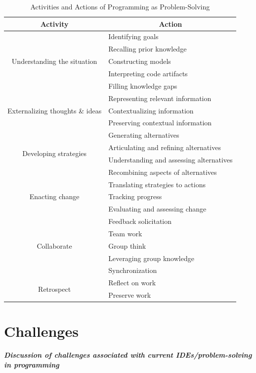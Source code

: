 \documentclass{ppig}
\newcommand{\bold}[1]{\textit{\textbf{\color{aoblue}#1}}} %
\begin{document}
\begin{table}[!htbp]
\caption{Activities and Actions of Programming as Problem-Solving}
\label{matrix}
\centering
\begin{tabular}{|c|l|}
	\hline
	\multicolumn{1}{|c|}{\textbf{Activity}} 
	& \multicolumn{1}{c|}{\textbf{Action}}\\\hline
	\multirow{5}{*}{Understanding the situation} 
	& Identifying goals \\\cline{2-2}
	& Recalling prior knowledge \\\cline{2-2}
	& Constructing models \\\cline{2-2}
	& Interpreting code artifacts \\\cline{2-2}
	& Filling knowledge gaps \\\hline
	\multirow{3}{*}{Externalizing thoughts \& ideas} 
	& Representing relevant information \\\cline{2-2}
	& Contextualizing information \\\cline{2-2}
	& Preserving contextual information \\\hline
	\multirow{4}{*}{Developing strategies} 
	& Generating alternatives \\\cline{2-2}
	& Articulating and refining alternatives \\\cline{2-2}
	& Understanding and assessing alternatives \\\cline{2-2}
	& Recombining aspects of alternatives \\\hline
	\multirow{3}{*}{Enacting change} 
	& Translating strategies to actions \\\cline{2-2}
	& Tracking progress \\\cline{2-2}
	& Evaluating and assessing change \\\hline
	\multirow{5}{*}{Collaborate} 
	& Feedback solicitation \\\cline{2-2}
	& Team work \\\cline{2-2}
	& Group think \\\cline{2-2}
	& Leveraging group knowledge \\\cline{2-2}
	& Synchronization \\\hline
	\multirow{2}{*}{Retrospect} 
	& Reflect on work \\\cline{2-2}
	& Preserve work \\\hline
\end{tabular}
\end{table}

\section{Challenges}
\bold{Discussion of challenges associated with current IDEs/problem-solving in programming}
\end{document}

